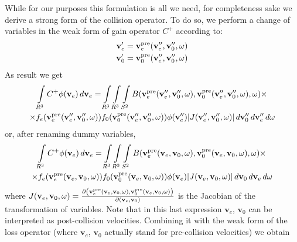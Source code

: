 \documentclass{article}
\newcommand{\myint}{\int\limits}
\newcommand{\diff}[1]{\, d#1}
\newcommand{\vect}[1]{\mathbf{#1}}
\newcommand{\of}[1]{\mleft( #1 \mright)}
\begin{document}
While for our purposes this formulation is all we need, for completeness sake we derive a strong form of the collision operator. To do so, we perform a change of variables in the weak form of gain operator $C^+$ according to:
\begin{align*}
\vect{v}_e^\prime &= \vect{v}_e^\text{pre} \of{\vect{v}_e^{\prime\prime}, \vect{v}_0^{\prime\prime}, \vect{\omega}}
\\
\vect{v}_0^\prime &= \vect{v}_0^\text{pre} \of{\vect{v}_e^{\prime\prime}, \vect{v}_0^{\prime\prime}, \vect{\omega}}
\end{align*}
As result we get
\begin{multline*}
\myint_{R^3} C^+ \phi\of{\vect{v}_e} \diff{\vect{v}_e} 
= 
\myint_{R^3} \myint_{R^3} \myint_{S^2} 
B\of{\vect{v}_e^\text{pre} \of{\vect{v}_e^{\prime\prime}, \vect{v}_0^{\prime\prime}, \vect{\omega}}, \vect{v}_0^\text{pre} \of{\vect{v}_e^{\prime\prime}, \vect{v}_0^{\prime\prime}, \vect{\omega}}, \vect{\omega}} 
\times
\\
\times
f_e\of{\vect{v}_e^\text{pre} \of{\vect{v}_e^{\prime\prime}, \vect{v}_0^{\prime\prime}, \vect{\omega}}} 
f_0\of{\vect{v}_0^\text{pre} \of{\vect{v}_e^{\prime\prime}, \vect{v}_0^{\prime\prime}, \vect{\omega}}} 
\phi\of{\vect{v}_e^{\prime\prime}} 
|J\of{\vect{v}_e^{\prime\prime}, \vect{v}_0^{\prime\prime}, \vect{\omega}}|
\diff{\vect{v}_0^{\prime\prime}} \diff{\vect{v}_e^{\prime\prime}} \diff{\vect{\omega}}
\end{multline*}
or, after renaming dummy variables,
\begin{multline*}
\myint_{R^3} C^+ \phi\of{\vect{v}_e} \diff{\vect{v}_e} 
= 
\myint_{R^3} \myint_{R^3} \myint_{S^2} 
B\of{\vect{v}_e^\text{pre} \of{\vect{v}_e, \vect{v}_0, \vect{\omega}}, \vect{v}_0^\text{pre} \of{\vect{v}_e, \vect{v}_0, \vect{\omega}}, \vect{\omega}} 
\times
\\
\times
f_e\of{\vect{v}_e^\text{pre} \of{\vect{v}_e, \vect{v}_0, \vect{\omega}}} 
f_0\of{\vect{v}_0^\text{pre} \of{\vect{v}_e, \vect{v}_0, \vect{\omega}}} 
\phi\of{\vect{v}_e} 
|J\of{\vect{v}_e, \vect{v}_0, \vect{\omega}}|
\diff{\vect{v}_0} \diff{\vect{v}_e} \diff{\vect{\omega}}
\end{multline*}
where $J\of{\vect{v}_e, \vect{v}_0, \vect{\omega}} = \frac{ \partial \left( \vect{v}_e^\text{pre}\of{\vect{v}_e, \vect{v}_0, \vect{\omega}}, \vect{v}_0^\text{pre}\of{\vect{v}_e, \vect{v}_0, \vect{\omega}} \right)}{\partial \left( \vect{v}_e, \vect{v}_0 \right)}$ is the Jacobian of the transformation of variables. Note that in this last expression $\vect{v}_e$, $\vect{v}_0$ can be interpreted as post-collision velocities. Combining it with the weak form of the loss operator (where $\vect{v}_e$, $\vect{v}_0$ actually stand for pre-collision velocities) we obtain
\end{document}
